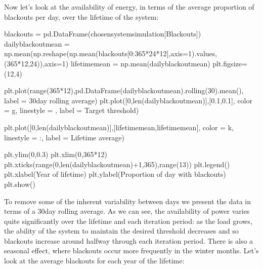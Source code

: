 \documentclass[letterpaper,10pt,english]{sphinxmanual}
\begin{document}
\sphinxAtStartPar
Now let’s look at the availability of energy, in terms of the average
proportion of blackouts per day, over the lifetime of the system:

\begin{sphinxVerbatim}[commandchars=\\\{\}]
blackouts = pd.DataFrame(chosen\PYGZus{}system\PYGZus{}simulation[\PYGZsq{}Blackouts\PYGZsq{}])
daily\PYGZus{}blackout\PYGZus{}mean = np.mean(np.reshape(np.mean(blackouts[0:365*24*12],axis=1).values,(365*12,24)),axis=1)
lifetime\PYGZus{}mean = np.mean(daily\PYGZus{}blackout\PYGZus{}mean)
plt.figsize=(12,4)

plt.plot(range(365*12),pd.DataFrame(daily\PYGZus{}blackout\PYGZus{}mean).rolling(30).mean(), label = \PYGZsq{}30\PYGZhy{}day rolling average\PYGZsq{})
plt.plot([0,len(daily\PYGZus{}blackout\PYGZus{}mean)],[0.1,0.1],
         color = \PYGZsq{}g\PYGZsq{}, linestyle = \PYGZsq{}\PYGZhy{}\PYGZhy{}\PYGZsq{}, label = \PYGZsq{}Target threshold\PYGZsq{})

plt.plot([0,len(daily\PYGZus{}blackout\PYGZus{}mean)],[lifetime\PYGZus{}mean,lifetime\PYGZus{}mean],
         color = \PYGZsq{}k\PYGZsq{}, linestyle = \PYGZsq{}:\PYGZsq{}, label = \PYGZsq{}Lifetime average\PYGZsq{})

plt.ylim(0,0.3)
plt.xlim(0,365*12)
plt.xticks(range(0,len(daily\PYGZus{}blackout\PYGZus{}mean)+1,365),range(13))
plt.legend()
plt.xlabel(\PYGZsq{}Year of lifetime\PYGZsq{})
plt.ylabel(\PYGZsq{}Proportion of day with blackouts\PYGZsq{})
plt.show()
\end{sphinxVerbatim}

\noindent{}

\sphinxAtStartPar
To remove some of the inherent variability between days we present the
data in terms of a 30\sphinxhyphen{}day rolling average. As we can see, the
availability of power varies quite significantly over the lifetime and
each iteration period: as the load grows, the ability of the system to
maintain the desired threshold decreases and so blackouts increase
around halfway through each iteration period. There is also a seasonal
effect, where blackouts occur more frequently in the winter months.
Let’s look at the average blackouts for each year of the lifetime:
\end{document}
